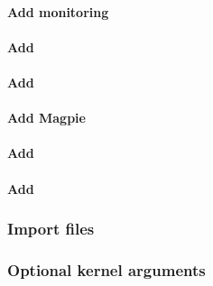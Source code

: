 \documentclass[letterpaper]{article}
\begin{document}
\paragraph{Add \Nagios{} monitoring} \label{sec:add_nagios}


\paragraph{Add \clustershell{}}


\paragraph{Add \genders{}}


\paragraph{Add Magpie}


\paragraph{Add \conman{}} \label{sec:add_conman}


\paragraph{Add \nhc{}} \label{sec:add_nhc}



\subsubsection{Import files} \label{sec:file_import}








\subsubsection{Optional kernel arguments} \label{sec:optional_kargs}



\end{document}
